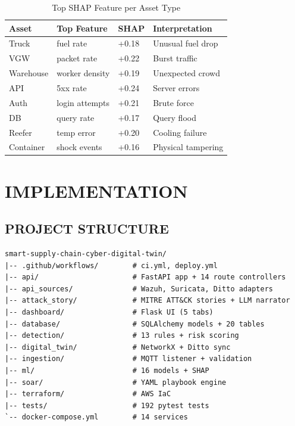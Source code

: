 \documentclass[12pt,a4paper]{amritareport}
\begin{document}
\begin{table}[H]
\centering
\caption{Top SHAP Feature per Asset Type}
\label{tab:shap_features}
\begin{tabular}{@{}P{3cm}P{3.2cm}P{1.8cm}P{4cm}@{}}
\toprule
\textbf{Asset} & \textbf{Top Feature} & \textbf{SHAP} & \textbf{Interpretation} \\
\midrule
Truck & fuel rate & +0.18 & Unusual fuel drop \\
VGW & packet rate & +0.22 & Burst traffic \\
Warehouse & worker density & +0.19 & Unexpected crowd \\
API & 5xx rate & +0.24 & Server errors \\
Auth & login attempts & +0.21 & Brute force \\
DB & query rate & +0.17 & Query flood \\
Reefer & temp error & +0.20 & Cooling failure \\
Container & shock events & +0.16 & Physical tampering \\
\bottomrule
\end{tabular}
\end{table}

\chapter{IMPLEMENTATION}

\section{PROJECT STRUCTURE}

\begin{lstlisting}[language={}, caption={SSCDT repository layout}]
smart-supply-chain-cyber-digital-twin/
|-- .github/workflows/        # ci.yml, deploy.yml
|-- api/                      # FastAPI app + 14 route controllers
|-- api_sources/              # Wazuh, Suricata, Ditto adapters
|-- attack_story/             # MITRE ATT&CK stories + LLM narrator
|-- dashboard/                # Flask UI (5 tabs)
|-- database/                 # SQLAlchemy models + 20 tables
|-- detection/                # 13 rules + risk scoring
|-- digital_twin/             # NetworkX + Ditto sync
|-- ingestion/                # MQTT listener + validation
|-- ml/                       # 16 models + SHAP
|-- soar/                     # YAML playbook engine
|-- terraform/                # AWS IaC
|-- tests/                    # 192 pytest tests
`-- docker-compose.yml        # 14 services
\end{lstlisting}
\end{document}
